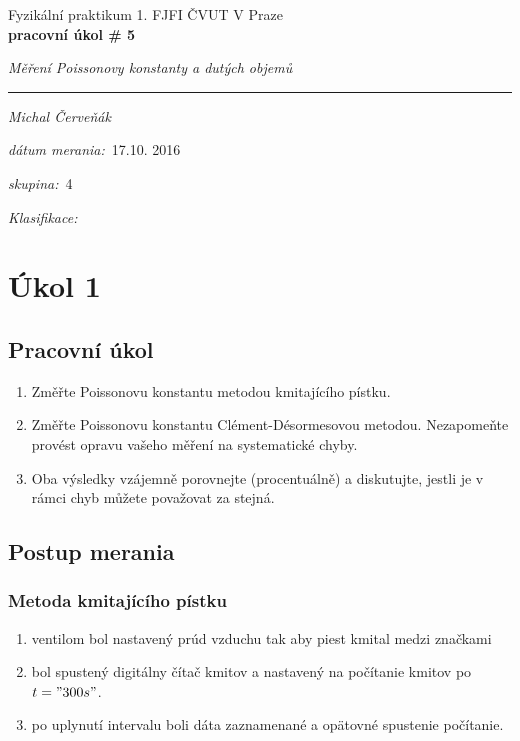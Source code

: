 \documentclass[a4paper,10pt]{article}
\begin{document}
\def\mean#1{\left< #1 \right>}
\noindent
{\large Fyzikální praktikum 1.} \hfil {\large FJFI ČVUT V Praze}\\
\noindent
{\large\textbf{pracovní úkol \# 5}}
\begin{center}
{\large\textit{Měření Poissonovy konstanty a dutých objemů}}
\end{center}
\noindent
\rule{\textwidth}{1px}
\vspace{\baselineskip}

\emph{Michal Červeňák}
\par
\vspace{\baselineskip}
\begin{minipage}[l]{0.5\textwidth}%
\textit{dátum merania:}~17.10. 2016\\%
\par%
\noindent%
\textit{skupina:}~4\\%
\par%
\noindent%
\textit{Klasifikace:}\dotfill\\%
\end{minipage}

\section{Úkol 1}
\subsection{Pracovní úkol}

\begin{enumerate}
\item Změřte Poissonovu konstantu metodou kmitajícího pístku.
\item Změřte Poissonovu konstantu Clément-Désormesovou metodou. Nezapomeňte provést
opravu vašeho měření na systematické chyby.
\item Oba výsledky vzájemně porovnejte (procentuálně) a diskutujte, jestli je v rámci chyb
můžete považovat za stejná.
\end{enumerate}


\subsection{Postup merania}
\subsubsection{Metoda kmitajícího pístku}
\begin{enumerate}
\item ventilom bol nastavený prúd vzduchu tak aby piest kmital medzi značkami
\item bol spustený digitálny čítač kmitov a nastavený na počítanie kmitov po $t="300 s"$.
\item po uplynutí intervalu boli dáta zaznamenané a opätovné spustenie počítanie. 
\end{enumerate}
\end{document}
